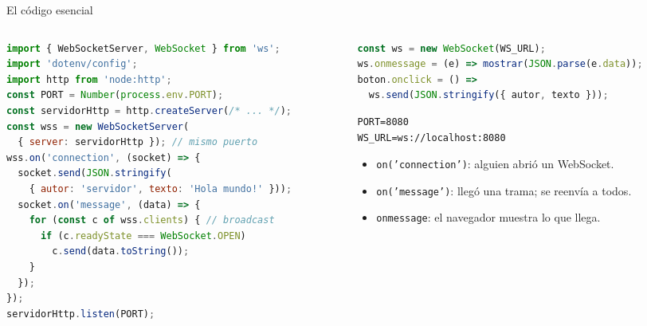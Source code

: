 \documentclass[aspectratio=169,11pt]{beamer}
\begin{document}
\begin{frame}[fragile]{El código esencial}
  \begin{columns}[T]
    \begin{column}{0.57\textwidth}
\begin{lstlisting}[language=JavaScript,title={\scriptsize\bfseries server.js (proceso 1)}]
import { WebSocketServer, WebSocket } from 'ws';
import 'dotenv/config';
import http from 'node:http';
const PORT = Number(process.env.PORT);
const servidorHttp = http.createServer(/* ... */);
const wss = new WebSocketServer(
  { server: servidorHttp }); // mismo puerto
wss.on('connection', (socket) => {
  socket.send(JSON.stringify(
    { autor: 'servidor', texto: 'Hola mundo!' }));
  socket.on('message', (data) => {
    for (const c of wss.clients) { // broadcast
      if (c.readyState === WebSocket.OPEN)
        c.send(data.toString());
    }
  });
});
servidorHttp.listen(PORT);
\end{lstlisting}
    \end{column}
    \begin{column}{0.41\textwidth}
\begin{lstlisting}[language=JavaScript,title={\scriptsize\bfseries index.html (procesos 2 y 3)}]
const ws = new WebSocket(WS_URL);
ws.onmessage = (e) => mostrar(JSON.parse(e.data));
boton.onclick = () =>
  ws.send(JSON.stringify({ autor, texto }));
\end{lstlisting}
\begin{lstlisting}[language={},title={\scriptsize\bfseries .env.example}]
PORT=8080
WS_URL=ws://localhost:8080
\end{lstlisting}
      \vspace{2pt}
      \begin{itemize}\scriptsize\setlength{\itemsep}{0pt}
        \item \texttt{on('connection')}: alguien abrió un WebSocket.
        \item \texttt{on('message')}: llegó una trama; se reenvía a todos.
        \item \texttt{onmessage}: el navegador muestra lo que llega.
      \end{itemize}
    \end{column}
  \end{columns}
\end{frame}
\end{document}

